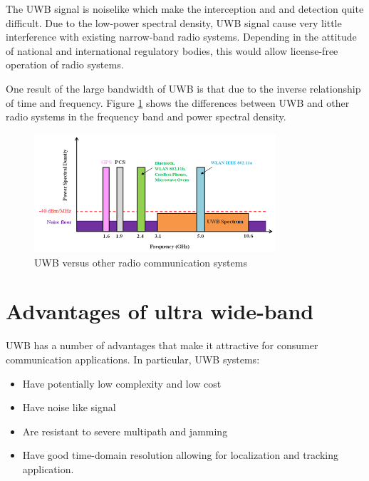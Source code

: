 \documentclass[\main/main.tex]{subfiles}
\begin{document}
The UWB signal is noiselike which make the interception and and detection quite difficult. Due to the low-power spectral density, UWB signal cause very little interference with existing narrow-band radio systems. Depending in the attitude of national and international regulatory bodies, this would allow license-free operation of radio systems.

One result of the large bandwidth of UWB is that due to the inverse relationship of
time and frequency. Figure \ref{fig:uwb_versus_other_radio_communication_systems} shows the differences between UWB and other radio systems in the frequency band and power spectral density.

\begin{figure}[H]
    \centering
    \includegraphics[width=0.8\textwidth]{uwb_versus_other_radio_communication_systems.png}
    \caption{UWB versus other radio communication systems}
    \label{fig:uwb_versus_other_radio_communication_systems}
\end{figure}

\section{Advantages of ultra wide-band}

UWB has a number of advantages that make it attractive for consumer communication applications. In particular, UWB systems:
\begin{itemize}
    \item Have potentially low complexity and low cost
    \item Have noise like signal
    \item Are resistant to severe multipath and jamming
    \item Have good time-domain resolution allowing for localization and tracking application.
\end{itemize}
\end{document}
